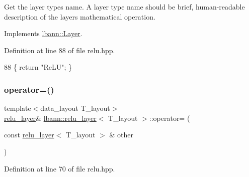 Get the layer type\textquotesingle{}s name. A layer type name should be brief, human-\/readable description of the layer\textquotesingle{}s mathematical operation. 

Implements \hyperlink{classlbann_1_1Layer_a0fa0ea9160b490c151c0a17fde4f7239}{lbann\+::\+Layer}.



Definition at line 88 of file relu.\+hpp.


\begin{DoxyCode}
88 \{ \textcolor{keywordflow}{return} \textcolor{stringliteral}{"ReLU"}; \}
\end{DoxyCode}
\mbox{\label{classlbann_1_1relu__layer_a455500a9ee8e9fbef2db3d8943e65d7d}} 
\subsubsection{\texorpdfstring{operator=()}{operator=()}}
{\footnotesize\ttfamily template$<$data\+\_\+layout T\+\_\+layout$>$ \\
\hyperlink{classlbann_1_1relu__layer}{relu\+\_\+layer}\& \hyperlink{classlbann_1_1relu__layer}{lbann\+::relu\+\_\+layer}$<$ T\+\_\+layout $>$\+::operator= (\begin{DoxyParamCaption}\item[{const \hyperlink{classlbann_1_1relu__layer}{relu\+\_\+layer}$<$ T\+\_\+layout $>$ \&}]{other }\end{DoxyParamCaption})\hspace{0.3cm}{\ttfamily [inline]}}



Definition at line 70 of file relu.\+hpp.


